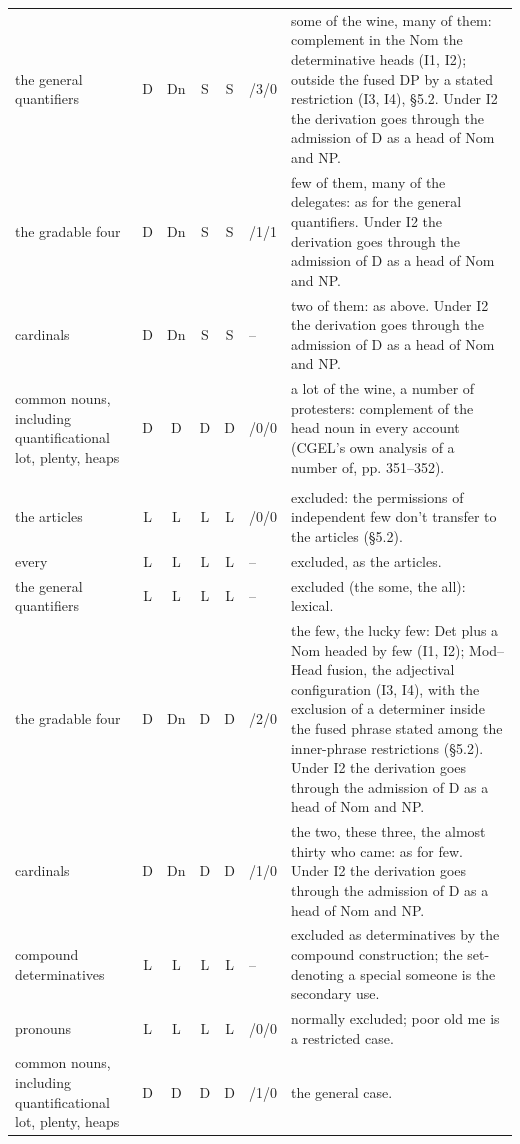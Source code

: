 {\begin{longtable}{>{\raggedright\arraybackslash}p{2.2cm}cccc>{\raggedright\arraybackslash}p{1.0cm}>{\raggedright\arraybackslash}p{7.2cm}}
the general quantifiers & D & Dn & S & S & 3/3/0 & some of the wine, many of them: complement in the Nom the determinative heads (I1, I2); outside the fused DP by a stated restriction (I3, I4), §5.2. Under I2 the derivation goes through the admission of D as a head of Nom and NP. \\
the gradable four & D & Dn & S & S & 2/1/1 & few of them, many of the delegates: as for the general quantifiers. Under I2 the derivation goes through the admission of D as a head of Nom and NP. \\
cardinals & D & Dn & S & S & -- & two of them: as above. Under I2 the derivation goes through the admission of D as a head of Nom and NP. \\
common nouns, including quantificational lot, plenty, heaps & D & D & D & D & 4/0/0 & a lot of the wine, a number of protesters: complement of the head noun in every account (CGEL's own analysis of a number of, pp. 351–352). \\
\multicolumn{7}{l}{\itshape external determination of an independent use (§4.3)} \\
the articles & L & L & L & L & 1/0/0 & excluded: the permissions of independent few don't transfer to the articles (§5.2). \\
every & L & L & L & L & -- & excluded, as the articles. \\
the general quantifiers & L & L & L & L & -- & excluded (the some, the all): lexical. \\
the gradable four & D & Dn & D & D & 3/2/0 & the few, the lucky few: Det plus a Nom headed by few (I1, I2); Mod–Head fusion, the adjectival configuration (I3, I4), with the exclusion of a determiner inside the fused phrase stated among the inner-phrase restrictions (§5.2). Under I2 the derivation goes through the admission of D as a head of Nom and NP. \\
cardinals & D & Dn & D & D & 0/1/0 & the two, these three, the almost thirty who came: as for few. Under I2 the derivation goes through the admission of D as a head of Nom and NP. \\
compound determinatives & L & L & L & L & -- & excluded as determinatives by the compound construction; the set-denoting a special someone is the secondary use. \\
pronouns & L & L & L & L & 1/0/0 & normally excluded; poor old me is a restricted case. \\
common nouns, including quantificational lot, plenty, heaps & D & D & D & D & 0/1/0 & the general case. \\

\end{longtable}}
